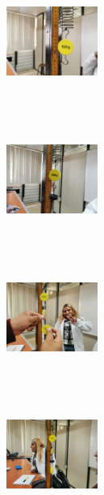 \documentclass[10pt]{article}
\begin{document}
\begin{multicols}{2}
\begin{center}
	\includegraphics[width=3cm, height=4cm]{Imagenes/100gr.jpeg}
\end{center}
\begin{center}
	\includegraphics[width=3cm, height=4cm]{Imagenes/200gr.jpeg}
\end{center}
\begin{center}
	\includegraphics[width=3cm, height=4cm]{Imagenes/250gr.jpeg}
\end{center}
\begin{center}
	\includegraphics[width=3cm, height=4cm]{Imagenes/300gr.jpeg}

\end{center}
\end{multicols}
\end{document}

